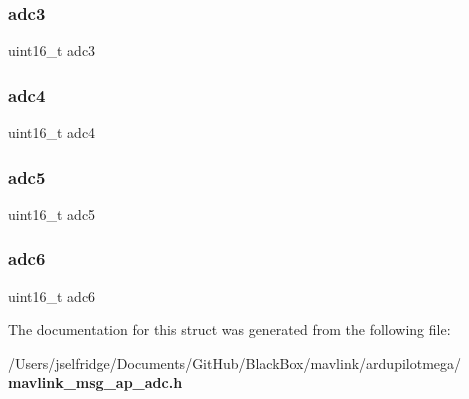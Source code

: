 \mbox{\label{struct____mavlink__ap__adc__t_a73155fd0f108d8480ccdd43612e612bd}} 
\subsubsection{adc3}
{\footnotesize\ttfamily uint16\+\_\+t adc3}

\mbox{\label{struct____mavlink__ap__adc__t_a87010d5da870e04ee738efb274a7f0c4}} 
\subsubsection{adc4}
{\footnotesize\ttfamily uint16\+\_\+t adc4}

\mbox{\label{struct____mavlink__ap__adc__t_a6bd577ee34fb33a6e585d24815f6b87a}} 
\subsubsection{adc5}
{\footnotesize\ttfamily uint16\+\_\+t adc5}

\mbox{\label{struct____mavlink__ap__adc__t_a0df84c03ae5df9794b9d972fb8069ab7}} 
\subsubsection{adc6}
{\footnotesize\ttfamily uint16\+\_\+t adc6}



The documentation for this struct was generated from the following file\+:\begin{DoxyCompactItemize}
\item 
/\+Users/jselfridge/\+Documents/\+Git\+Hub/\+Black\+Box/mavlink/ardupilotmega/\textbf{ mavlink\+\_\+msg\+\_\+ap\+\_\+adc.\+h}\end{DoxyCompactItemize}
